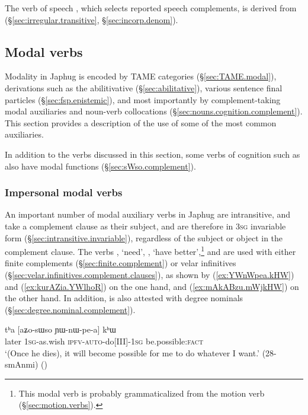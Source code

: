 The verb of speech , which selects reported speech complements, is derived from  (§\ref{sec:irregular.transitive}, §\ref{sec:incorp.denom}).

 \subsection{Modal verbs}
Modality in Japhug is encoded by TAME categories (§\ref{sec:TAME.modal}), derivations such as the abilitivative (§\ref{sec:abilitative}), various sentence final particles (§\ref{sec:fsp.epistemic}), and most importantly by complement-taking modal auxiliaries and noun-verb collocations (§\ref{sec:nouns.cognition.complement}). This section provides a description of the use of some of the most common auxiliaries. 
  
In addition to the verbs discussed in this section, some verbs of cognition such as   also have modal functions (§\ref{sec:sWso.complement}).


 \subsubsection{Impersonal modal verbs} \label{sec:ra.khW.jAG.verb}
An important number of modal auxiliary verbs in Japhug are intransitive, and take a complement clause as their subject, and are therefore in \textsc{3sg} invariable form (§\ref{sec:intransitive.invariable}), regardless of the subject or object in the complement clause. The verbs , `need', , `have better',\footnote{This modal verb is probably grammaticalized from the motion verb (§\ref{sec:motion.verbs}).} and  are used with either finite complements (§\ref{sec:finite.complement}) or velar infinitives (§\ref{sec:velar.infinitives.complement.clauses}), as shown by (\ref{ex:YWnWpea.kHW}) and (\ref{ex:kurAZia.YWlhoR}) on the one hand, and (\ref{ex:mAkABzu.mWjkHW}) on the other hand. In addition,  is also attested with degree nominals (§\ref{sec:degree.nominal.complement}).

\begin{exe} 
\ex \label{ex:YWnWpea.kHW}
\gll tʰa [aʑo-sɯso ɲɯ-nɯ-pe-a] kʰɯ \\
later \textsc{1sg}-as.wish \textsc{ipfv}-\textsc{auto}-do[III]-\textsc{1sg} be.possible:\textsc{fact} \\
\glt `(Once he dies), it will become possible for me to do whatever I want.' (28-smAnmi)
()
\end{exe} 

